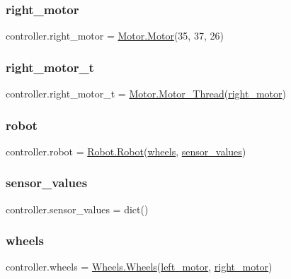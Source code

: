 \subsubsection{\texorpdfstring{right\+\_\+motor}{right\_motor}}
{\footnotesize\ttfamily controller.\+right\+\_\+motor = \mbox{\hyperlink{class_motor_1_1_motor}{Motor.\+Motor}}(35, 37, 26)}

\mbox{\label{namespacecontroller_a6256e3281526776faed48e0dbfb596ec}} 
\subsubsection{\texorpdfstring{right\+\_\+motor\+\_\+t}{right\_motor\_t}}
{\footnotesize\ttfamily controller.\+right\+\_\+motor\+\_\+t = \mbox{\hyperlink{class_motor_1_1_motor___thread}{Motor.\+Motor\+\_\+\+Thread}}(\mbox{\hyperlink{namespacecontroller_a01c7aa0aed71e493785716166c882f4f}{right\+\_\+motor}})}

\mbox{\label{namespacecontroller_a16bd60420374c0595e623e0f1706972a}} 
\subsubsection{\texorpdfstring{robot}{robot}}
{\footnotesize\ttfamily controller.\+robot = \mbox{\hyperlink{class_robot_1_1_robot}{Robot.\+Robot}}(\mbox{\hyperlink{namespacecontroller_ac1696e3b9bdd35da786bc99515eee2b9}{wheels}}, \mbox{\hyperlink{namespacecontroller_a189bd3b1eaf031673385cc627be55bee}{sensor\+\_\+values}})}

\mbox{\label{namespacecontroller_a189bd3b1eaf031673385cc627be55bee}} 
\subsubsection{\texorpdfstring{sensor\+\_\+values}{sensor\_values}}
{\footnotesize\ttfamily controller.\+sensor\+\_\+values = dict()}

\mbox{\label{namespacecontroller_ac1696e3b9bdd35da786bc99515eee2b9}} 
\subsubsection{\texorpdfstring{wheels}{wheels}}
{\footnotesize\ttfamily controller.\+wheels = \mbox{\hyperlink{class_wheels_1_1_wheels}{Wheels.\+Wheels}}(\mbox{\hyperlink{namespacecontroller_accafb331d0342effadbbe3609c156598}{left\+\_\+motor}}, \mbox{\hyperlink{namespacecontroller_a01c7aa0aed71e493785716166c882f4f}{right\+\_\+motor}})}


